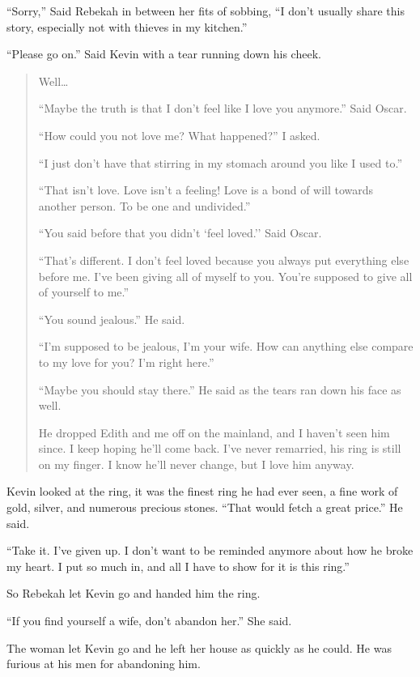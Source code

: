 ``Sorry,'' Said Rebekah in between her fits of sobbing, ``I don't usually share this story, especially not with thieves in my kitchen.''

``Please go on.'' Said Kevin with a tear running down his cheek.

\begin{quote}

Well\ldots

``Maybe the truth is that I don't feel like I love you anymore.'' Said Oscar.

``How could you not love me? What happened?'' I asked.

``I just don't have that stirring in my stomach around you like I used to.''

``That isn't love. Love isn't a feeling! Love is a bond of will towards another person. To be one and undivided.''

``You said before that you didn't `feel loved.'' Said Oscar.

``That's different. I don't feel loved because you always put everything else before me. I've been giving all of myself to you. You're supposed to give all of yourself to me.''

``You sound jealous.'' He said.

``I'm supposed to be jealous, I'm your wife. How can anything else compare to my love for you? I'm right here.''

``Maybe you should stay there.'' He said as the tears ran down his face as well.

He dropped Edith and me off on the mainland, and I haven't seen him since. I keep hoping he'll come back. I've never remarried, his ring is still on my finger. I know he'll never change, but I love him anyway.

\end{quote}

Kevin looked at the ring, it was the finest ring he had ever seen, a fine work of gold, silver, and numerous precious stones.
``That would fetch a great price.'' He said.

``Take it. I've given up. I don't want to be reminded anymore about how he broke my heart. I put so much in, and all I have to show for it is this ring.''

So Rebekah let Kevin go and handed him the ring.

``If you find yourself a wife, don't abandon her.'' She said.

The woman let Kevin go and he left her house as quickly as he could. He was furious at his men for abandoning him.

